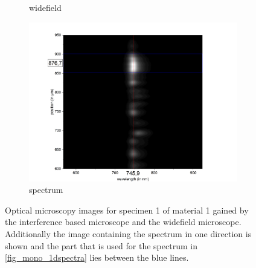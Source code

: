 \begin{figure}[!ht]
\begin{subfigure}{0.47\textwidth}
        \caption{widefield}
	      \label{fig_mono_spec1_wide}
    \end{subfigure}
    \begin{subfigure}{0.7\textwidth}
        \centering
        \includegraphics[width=\textwidth]{img/output_t1/bild_m1-3.png}
        \caption{spectrum}
	      \label{fig_mono_spec1_spec}
    \end{subfigure}
    \caption{Optical microscopy images for specimen 1 of material 1 gained by the interference based microscope and the widefield microscope. Additionally the image containing the spectrum in one direction is shown and the part that is used for the spectrum in \cref{fig_mono_1dspectra} lies between the blue lines.}
	\label{fig_mono_spec1} %
\end{figure}

